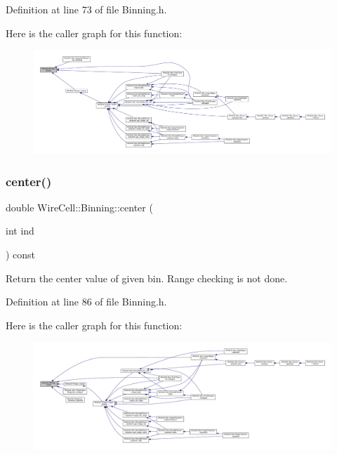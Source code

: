 Definition at line 73 of file Binning.\+h.

Here is the caller graph for this function\+:
\nopagebreak
\begin{figure}[H]
\begin{center}
\leavevmode
\includegraphics[width=350pt]{class_wire_cell_1_1_binning_a55ba6a476ed35f5954fd44214e85dbb9_icgraph}
\end{center}
\end{figure}
\mbox{\label{class_wire_cell_1_1_binning_ac53704b170f6bd834632fdc75f7a70cc}} 
\subsubsection{\texorpdfstring{center()}{center()}}
{\footnotesize\ttfamily double Wire\+Cell\+::\+Binning\+::center (\begin{DoxyParamCaption}\item[{int}]{ind }\end{DoxyParamCaption}) const\hspace{0.3cm}{\ttfamily [inline]}}

Return the center value of given bin. Range checking is not done. 

Definition at line 86 of file Binning.\+h.

Here is the caller graph for this function\+:
\nopagebreak
\begin{figure}[H]
\begin{center}
\leavevmode
\includegraphics[width=350pt]{class_wire_cell_1_1_binning_ac53704b170f6bd834632fdc75f7a70cc_icgraph}
\end{center}
\end{figure}
\mbox{\label{class_wire_cell_1_1_binning_a0ed21ab262df2a11eac561e53ee3cb77}} 

